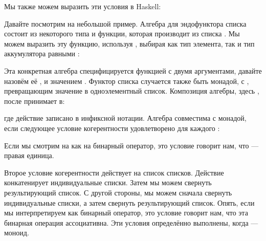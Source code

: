 \begin{figure}[H]
  \centering
  \begin{subfigure}
    \centering
  \end{subfigure}
  \hspace{1cm}
  \begin{subfigure}
    \centering
  \end{subfigure}
\end{figure}

\noindent
Мы также можем выразить эти условия в Haskell:

Давайте посмотрим на небольшой пример. Алгебра для эндофунктора списка
состоит из некоторого типа  и функции, которая производит
 из списка . Мы можем выразить эту функцию, используя
, выбирая как тип элемента, так и тип аккумулятора
равными :

Эта конкретная алгебра специфицируется функцией с двумя аргументами, давайте
назовём её , и значением . Функтор списка случается
также быть монадой, с , превращающим значение в одноэлементный
список. Композиция алгебры, здесь , после
 принимает  в:

где действие  записано в инфиксной нотации.
Алгебра совместима с монадой, если следующее условие
когерентности удовлетворено для каждого :

Если мы смотрим на  как на бинарный оператор, это условие говорит нам,
что  --- правая единица.

Второе условие когерентности действует на список списков. Действие
 конкатенирует индивидуальные списки. Затем мы можем свернуть
результирующий список. С другой стороны, мы можем сначала свернуть индивидуальные
списки, а затем свернуть результирующий список. Опять, если мы интерпретируем
 как бинарный оператор, это условие говорит нам, что эта
бинарная операция ассоциативна. Эти условия определённо
выполнены, когда  --- моноид.

